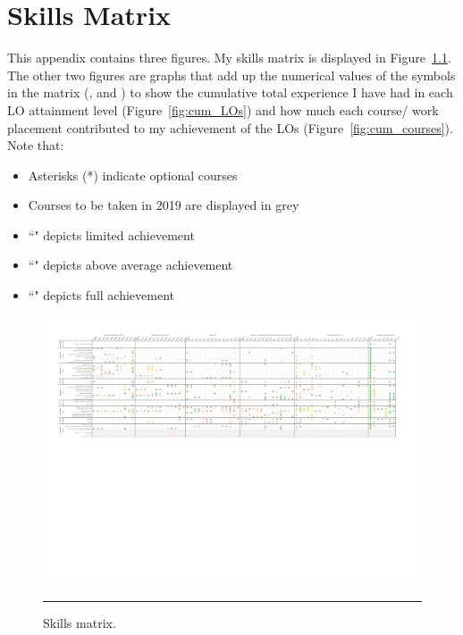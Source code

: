 \chapter{Skills Matrix} %

\label{App:matrix} %


This appendix contains three figures.
My skills matrix is displayed in Figure~\ref{fig:matrix}.
The other two figures are graphs that add up the numerical values of the symbols in the matrix (,  and ) to show the cumulative total experience I have had in each LO attainment level (Figure~\ref{fig:cum_LOs}) and how much each course/ work placement contributed to my achievement of the LOs (Figure~\ref{fig:cum_courses}).
Note that:
\begin{itemize}
	\item Asterisks (*) indicate optional courses
	\item Courses to be taken in 2019 are displayed in grey
	\item ``\littlemaster" depicts limited achievement
	\item ``\nomaster" depicts above average achievement
	\item ``\master" depicts full achievement
\end{itemize}


\begin{figure}
	\centering
	\includegraphics[width=\textwidth]{Appendices/Skill-Course-Matrix-small.pdf}
	\rule{\textwidth}{0.5pt} %
	\caption{Skills matrix.}
	\label{fig:matrix}
\end{figure}


